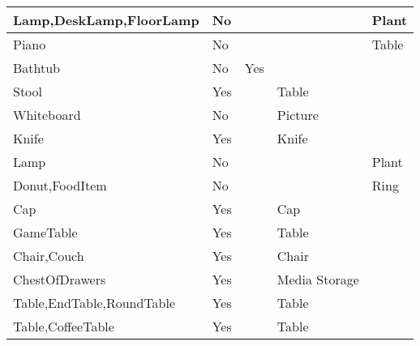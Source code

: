 \documentclass{article}
\begin{document}
\begin{longtable}{|l|l|l|l|l|}
Lamp,DeskLamp,FloorLamp                  & No               &                                &                & Plant                       \\ \hline
Piano                                    & No               &                                &                & Table                       \\ \hline
Bathtub                                  & No               & Yes                            &                &                             \\ \hline
Stool                                    & Yes              &                                & Table          &                             \\ \hline
Whiteboard                               & No               &                                & Picture        &                             \\ \hline
Knife                                    & Yes              &                                & Knife          &                             \\ \hline
Lamp                                     & No               &                                &                & Plant                       \\ \hline
Donut,FoodItem                           & No               &                                &                & Ring                        \\ \hline
Cap                                      & Yes              &                                & Cap            &                             \\ \hline
GameTable                                & Yes              &                                & Table          &                             \\ \hline
Chair,Couch                              & Yes              &                                & Chair          &                             \\ \hline
ChestOfDrawers                           & Yes              &                                & Media Storage  &                             \\ \hline
Table,EndTable,RoundTable                & Yes              &                                & Table          &                             \\ \hline
Table,CoffeeTable                        & Yes              &                                & Table          &                             \\ \hline

\end{longtable}
\end{document}
